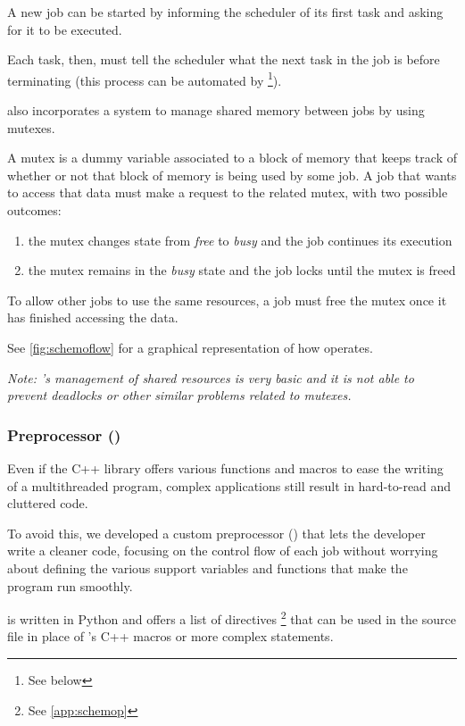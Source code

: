   A new job can be started by informing the scheduler of its first
  task and asking for it to be executed.

  Each task, then, must tell the scheduler what the next task in the
  job is before terminating (this process can be automated by
  \footnote{See below}).

  \ScheMo{} also incorporates a system to manage shared memory between
  jobs by using mutexes.

  \beforelist* A mutex is a dummy variable associated to a block of memory that
  keeps track of whether or not that block of memory is being used by
  some job. A job that wants to access that data must make a request
  to the related mutex, with two possible outcomes:
  \begin{enumerate}
    \item the mutex changes state from \textit{free} to
      \textit{busy} and the job continues its execution
    \item the mutex remains in the \textit{busy} state and the job
      locks until the mutex is freed
  \end{enumerate}
  \afterlist*
  To allow other jobs to use the same resources, a job must free the
  mutex once it has finished accessing the data.

  See \autoref{fig:schemoflow} for a graphical representation
  of how \ScheMo{} operates.

  \textit{Note: \ScheMo{}'s management of shared resources is very
  basic and it is not able to prevent deadlocks or other similar
  problems related to mutexes.}
 
\subsubsection{\ScheMo{} Preprocessor ()}
  Even if the C++ library offers various functions and macros to
  ease the writing of a multithreaded program, complex applications
  still result in hard-to-read and cluttered code.

  To avoid this, we developed a custom preprocessor
  () that lets the developer write a cleaner code,
  focusing on the control flow of each job without worrying about
  defining the various support variables and functions that make the
  program run smoothly.

   is written in Python and offers a list of directives%
  \footnote{See \autoref{app:schemop}} that can be used in the
  source file in place of \ScheMo{}'s C++ macros or more complex statements.
  
